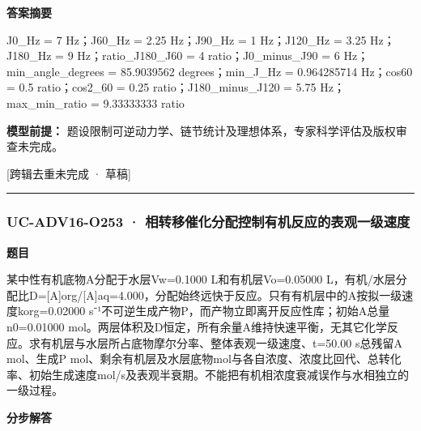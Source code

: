 \documentclass[UTF8,11pt,a4paper]{ctexart}
\begin{document}
\noindent\textbf{答案摘要}\par
J0\_Hz = 7 Hz；J60\_Hz = 2.25 Hz；J90\_Hz = 1 Hz；J120\_Hz = 3.25 Hz；J180\_Hz = 9 Hz；ratio\_J180\_J60 = 4 ratio；J0\_minus\_J90 = 6 Hz；min\_angle\_degrees = 85.9039562 degrees；min\_J\_Hz = 0.964285714 Hz；cos60 = 0.5 ratio；cos2\_60 = 0.25 ratio；J180\_minus\_J120 = 5.75 Hz；max\_min\_ratio = 9.33333333 ratio\par
\noindent\textbf{模型前提：}
题设限制可逆动力学、链节统计及理想体系，专家科学评估及版权审查未完成。\par
\noindent\textcolor{red!65!black}{[跨辑去重未完成 · 草稿]} \par
\medskip\hrule\medskip
{}
\subsubsection*{UC-ADV16-O253 · 相转移催化分配控制有机反应的表观一级速度}
\noindent\textbf{题目}\par
某中性有机底物A分配于水层Vw=0.1000 L和有机层Vo=0.05000 L，有机/水层分配比D=[A]org/[A]aq=4.000，分配始终远快于反应。只有有机层中的A按拟一级速度korg=0.02000 s⁻¹不可逆生成产物P，而产物立即离开反应性库；初始A总量n0=0.01000 mol。两层体积及D恒定，所有余量A维持快速平衡，无其它化学反应。求有机层与水层所占底物摩尔分率、整体表观一级速度、t=50.00 s总残留A mol、生成P mol、剩余有机层及水层底物mol与各自浓度、浓度比回代、总转化率、初始生成速度mol/s及表观半衰期。不能把有机相浓度衰减误作与水相独立的一级过程。\par
\medskip\noindent\textbf{分步解答}
\end{document}
